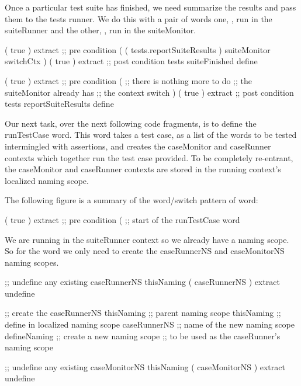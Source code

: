 Once a particular test suite has finished, we need summarize the results 
and pass them to the tests runner. We do this with a pair of words one, 
, run in the suiteRunner and the other, 
, run in the suiteMonitor. 

\startJoylolCode
( { true } ) extract ;; pre condition
(
  ( tests.reportSuiteResults )
  suiteMonitor
  switchCtx
)
( { true } ) extract ;; post condition
tests
suiteFinished
define
\stopJoylolCode

\startJoylolCode
( { true } ) extract ;; pre condition
(
          ;; there is nothing more to do
          ;; the suiteMonitor already has
          ;; the context switch 
)
( { true } ) extract ;; post condition
tests
reportSuiteResults
define
\stopJoylolCode

\stopTestSuite

\startTestSuite[runTestCase]

Our next task, over the next following code fragments, is to define the 
runTestCase word. This word takes a test case, as a list of the words to 
be tested intermingled with assertions, and creates the caseMonitor and 
caseRunner contexts which together run the test case provided. To be 
completely re-entrant, the caseMonitor and caseRunner contexts are stored 
in the running context's localized naming scope. 

The following figure is a summary of the word/switch pattern of 
 word: 


\startJoylolCode
( { true } ) extract ;; pre condition
(               ;; start of the runTestCase word
\stopJoylolCode

We are running in the suiteRunner context so we already have a 
 naming scope. So for the  word we only 
need to create the caseRunnerNS and caseMonitorNS naming scopes. 

\startJoylolCode
  ;; undefine any existing caseRunnerNS
  thisNaming
  ( caseRunnerNS ) extract
  undefine

  ;; create the caseRunnerNS
  thisNaming   ;; parent naming scope
  thisNaming   ;; define in localized naming scope
  caseRunnerNS ;; name of the new naming scope
  defineNaming ;; create a new naming scope
               ;; to be used as the caseRunner's naming scope
\stopJoylolCode

\startJoylolCode
  ;; undefine any existing caseMonitorNS
  thisNaming
  ( caseMonitorNS ) extract
  undefine


